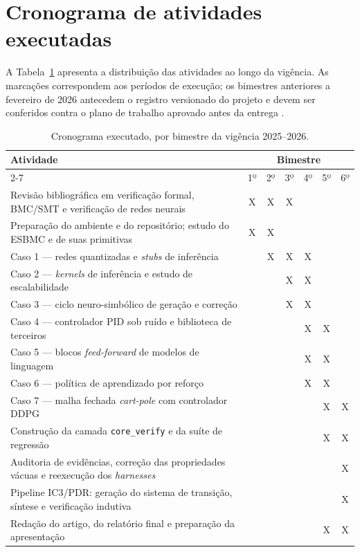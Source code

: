 \section{Cronograma de atividades executadas}
\label{sec:cronograma}

A Tabela~\ref{tab:cronograma} apresenta a distribuição das atividades ao longo da vigência.
As marcações correspondem aos períodos de execução; os bimestres anteriores a fevereiro de
2026 antecedem o registro versionado do projeto e devem ser conferidos contra o plano de
trabalho aprovado antes da entrega .

\begin{table}[H]
\centering
\caption{Cronograma executado, por bimestre da vigência 2025--2026.}
\label{tab:cronograma}
\footnotesize
\setlength{\tabcolsep}{4pt}
\begin{tabular}{@{}p{6.6cm}cccccc@{}}
\toprule
\multirow{2}{*}{\textbf{Atividade}} & \multicolumn{6}{c}{\textbf{Bimestre}} \\
\cmidrule(l){2-7}
 & 1º & 2º & 3º & 4º & 5º & 6º \\
\midrule
Revisão bibliográfica em verificação formal, BMC/SMT e verificação de redes neurais
 & X & X & X &   &   &   \\
Preparação do ambiente e do repositório; estudo do ESBMC e de suas primitivas
 & X & X &   &   &   &   \\
Caso 1 --- redes quantizadas e \textit{stubs} de inferência
 &   & X & X & X &   &   \\
Caso 2 --- \textit{kernels} de inferência e estudo de escalabilidade
 &   &   & X & X &   &   \\
Caso 3 --- ciclo neuro-simbólico de geração e correção
 &   &   & X & X &   &   \\
Caso 4 --- controlador PID sob ruído e biblioteca de terceiros
 &   &   &   & X & X &   \\
Caso 5 --- blocos \textit{feed-forward} de modelos de linguagem
 &   &   &   & X & X &   \\
Caso 6 --- política de aprendizado por reforço
 &   &   &   & X & X &   \\
Caso 7 --- malha fechada \textit{cart-pole} com controlador DDPG
 &   &   &   &   & X & X \\
Construção da camada \texttt{core\_verify} e da suíte de regressão
 &   &   &   &   & X & X \\
Auditoria de evidências, correção das propriedades vácuas e reexecução dos
\textit{harnesses}
 &   &   &   &   &   & X \\
Pipeline IC3/PDR: geração do sistema de transição, síntese e verificação indutiva
 &   &   &   &   &   & X \\
Redação do artigo, do relatório final e preparação da apresentação
 &   &   &   &   & X & X \\
\bottomrule
\end{tabular}
\end{table}

